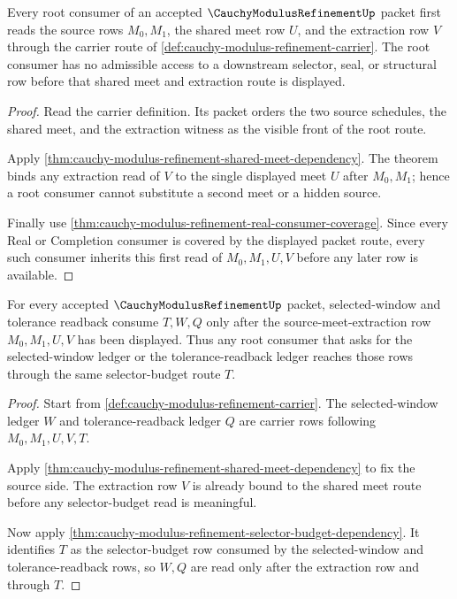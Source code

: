 \begin{theorem}
\label{thm:cauchy-modulus-refinement-root-source-binding}
Every root consumer of an accepted $\CauchyModulusRefinementUp$ packet first reads the source rows $M_0,M_1$, the shared meet row $U$, and the extraction row $V$ through the carrier route of \autoref{def:cauchy-modulus-refinement-carrier}. The root consumer has no admissible access to a downstream selector, seal, or structural row before that shared meet and extraction route is displayed.
\end{theorem}
\begin{proof}
Read the carrier definition. Its packet orders the two source schedules, the shared meet, and the extraction witness as the visible front of the root route.

Apply \autoref{thm:cauchy-modulus-refinement-shared-meet-dependency}. The theorem binds any extraction read of $V$ to the single displayed meet $U$ after $M_0,M_1$; hence a root consumer cannot substitute a second meet or a hidden source.

Finally use \autoref{thm:cauchy-modulus-refinement-real-consumer-coverage}. Since every Real or Completion consumer is covered by the displayed packet route, every such consumer inherits this first read of $M_0,M_1,U,V$ before any later row is available.
\end{proof}

\begin{theorem}
\label{thm:cauchy-modulus-refinement-root-selector-readback}
For every accepted $\CauchyModulusRefinementUp$ packet, selected-window and tolerance readback consume $T,W,Q$ only after the source-meet-extraction row $M_0,M_1,U,V$ has been displayed. Thus any root consumer that asks for the selected-window ledger or the tolerance-readback ledger reaches those rows through the same selector-budget route $T$.
\end{theorem}
\begin{proof}
Start from \autoref{def:cauchy-modulus-refinement-carrier}. The selected-window ledger $W$ and tolerance-readback ledger $Q$ are carrier rows following $M_0,M_1,U,V,T$.

Apply \autoref{thm:cauchy-modulus-refinement-shared-meet-dependency} to fix the source side. The extraction row $V$ is already bound to the shared meet route before any selector-budget read is meaningful.

Now apply \autoref{thm:cauchy-modulus-refinement-selector-budget-dependency}. It identifies $T$ as the selector-budget row consumed by the selected-window and tolerance-readback rows, so $W,Q$ are read only after the extraction row and through $T$.
\end{proof}

